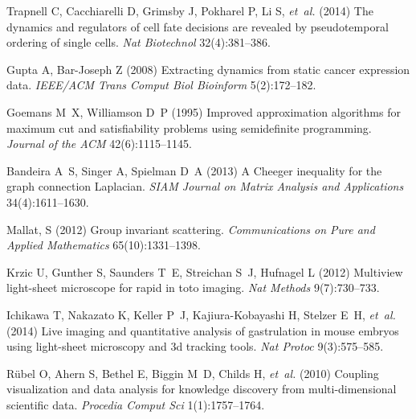 \documentclass{pnastwo}
\begin{document}
\begin{article}
\begin{thebibliography}{10}
Trapnell C, Cacchiarelli D, Grimsby J, Pokharel P, Li S, \textit{et~al.} (2014)
  The dynamics and regulators of cell fate decisions are revealed by
  pseudotemporal ordering of single cells. \textit{Nat Biotechnol} 32(4):381--386.

Gupta A, Bar-Joseph Z (2008) Extracting dynamics from static cancer expression
  data. \textit{IEEE/ACM Trans Comput Biol Bioinform} 5(2):172--182.



Goemans M~X, Williamson D~P (1995) Improved approximation algorithms for maximum cut and satisfiability problems using semidefinite programming.
\textit{Journal of the ACM} 42(6):1115--1145.

Bandeira A~S, Singer A, Spielman D~A (2013) A Cheeger inequality for the graph connection Laplacian. \textit{SIAM Journal on Matrix Analysis and Applications} 34(4):1611--1630.

Mallat, S (2012) Group invariant scattering. 
\textit{Communications on Pure and Applied Mathematics}
65(10):1331--1398.

Krzic U, Gunther S, Saunders T~E, Streichan S~J, Hufnagel L (2012) Multiview
  light-sheet microscope for rapid in toto imaging. \textit{Nat Methods}
  9(7):730--733.

Ichikawa T, Nakazato K, Keller P~J, Kajiura-Kobayashi H, Stelzer E~H,
  \textit{et~al.} (2014) Live imaging and quantitative analysis of gastrulation
  in mouse embryos using light-sheet microscopy and 3d tracking tools.
  \textit{Nat Protoc} 9(3):575--585.

R{\"u}bel O, Ahern S, Bethel E, Biggin M~D, Childs H, \textit{et~al.} (2010)
  Coupling visualization and data analysis for knowledge discovery from
  multi-dimensional scientific data. \textit{Procedia Comput Sci}
  1(1):1757--1764.

\end{thebibliography}



\end{article}
\end{document}
